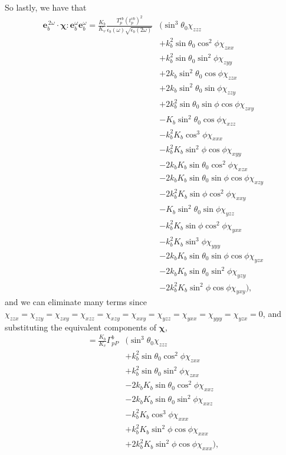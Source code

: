 So lastly, we have that
\begin{equation*}
\begin{split}
\mathbf{e}^{\,2\omega}_{b}\cdot
\boldsymbol{\chi}:\mathbf{e}^{\omega}_{b}\mathbf{e}^{\omega}_{b} =
\frac{K_{b}}{K_{v}}
\frac{T_{p}^{vb}\left(t^{vb}_{p}\right)^{2}}
     {\epsilon_{b}(\omega)\sqrt{\epsilon_{b}(2\omega)}}
&\big(
   \sin^{3}\theta_{0}\chi_{zzz}\\
&+ k^{2}_{b}\sin\theta_{0}\cos^{2}\phi\chi_{zxx}\\
&+ k^{2}_{b}\sin\theta_{0}\sin^{2}\phi\chi_{zyy}\\
&+ 2k_{b}\sin^{2}\theta_{0}\cos\phi\chi_{zzx}\\
&+ 2k_{b}\sin^{2}\theta_{0}\sin\phi\chi_{zzy}\\
&+ 2k^{2}_{b}\sin\theta_{0}\sin\phi\cos\phi\chi_{zxy}\\
&- K_{b}\sin^{2}\theta_{0}\cos\phi\chi_{xzz}\\
&- k^{2}_{b}K_{b}\cos^{3}\phi\chi_{xxx}\\
&- k^{2}_{b}K_{b}\sin^{2}\phi\cos\phi\chi_{xyy}\\
&- 2k_{b}K_{b}\sin\theta_{0}\cos^{2}\phi\chi_{xzx}\\
&- 2k_{b}K_{b}\sin\theta_{0}\sin\phi\cos\phi\chi_{xzy}\\
&- 2k^{2}_{b}K_{b}\sin\phi\cos^{2}\phi\chi_{xxy}\\
&- K_{b}\sin^{2}\theta_{0}\sin\phi\chi_{yzz}\\
&- k^{2}_{b}K_{b}\sin\phi\cos^{2}\phi\chi_{yxx}\\
&- k^{2}_{b}K_{b}\sin^{3}\phi\chi_{yyy}\\
&- 2k_{b}K_{b}\sin\theta_{0}\sin\phi\cos\phi\chi_{yzx}\\
&- 2k_{b}K_{b}\sin\theta_{0}\sin^{2}\phi\chi_{yzy}\\
&- 2k^{2}_{b}K_{b}\sin^{2}\phi\cos\phi\chi_{yxy}
\big),
\end{split}
\end{equation*}
and we can eliminate many terms since
$\chi_{zzx}=\chi_{zzy}=\chi_{zxy}=\chi_{xzz}=\chi_{xzy}=\chi_{xxy}=\chi_{yzz}
=\chi_{yxx}=\chi_{yyy}=\chi_{yzx}=0$, and substituting the equivalent
components of $\boldsymbol{\chi},$
\begin{equation*}
\begin{split}
=
\frac{K_{b}}{K_{v}}
\Gamma^{b}_{pP}
&\big(
   \sin^{3}\theta_{0}\chi_{zzz}\\
&+ k^{2}_{b}\sin\theta_{0}\cos^{2}\phi\chi_{zxx}\\
&+ k^{2}_{b}\sin\theta_{0}\sin^{2}\phi\chi_{zxx}\\
&- 2k_{b}K_{b}\sin\theta_{0}\cos^{2}\phi\chi_{xxz}\\
&- 2k_{b}K_{b}\sin\theta_{0}\sin^{2}\phi\chi_{xxz}\\
&- k^{2}_{b}K_{b}\cos^{3}\phi\chi_{xxx}\\
&+ k^{2}_{b}K_{b}\sin^{2}\phi\cos\phi\chi_{xxx}\\
&+ 2k^{2}_{b}K_{b}\sin^{2}\phi\cos\phi\chi_{xxx}
\big),
\end{split}
\end{equation*}
